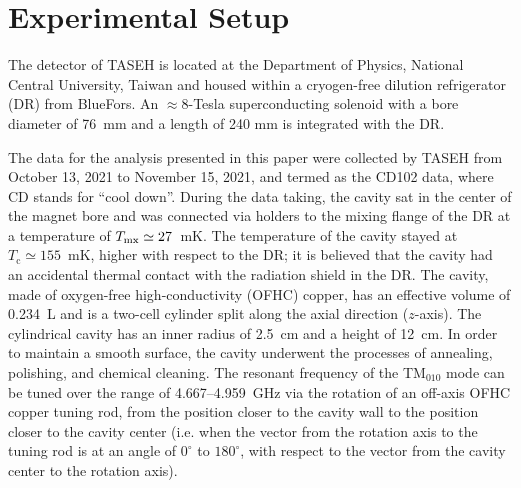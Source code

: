
\section{Experimental Setup}\label{sec:taseh} 
The detector of TASEH is located at the Department of Physics, National 
Central University, Taiwan and housed within a cryogen-free dilution 
refrigerator (DR) from BlueFors. An $\approx$8-Tesla superconducting solenoid 
with a 
bore diameter of 76~mm and a length of 240 mm is integrated with the DR. 

The data for the analysis presented in this paper were collected by TASEH 
from October 13, 2021 to November 15, 2021, and termed as the CD102 data, 
where CD stands for ``cool down''. 
During the data taking, the cavity sat in the center of the magnet bore 
and was connected via holders to the mixing flange of the DR at a 
temperature of $T_{\rm mx}\simeq27$~mK. 
The temperature of the cavity stayed at $T_\text{c}\simeq155$~mK, higher 
with respect to the 
DR; it is believed that the cavity had an accidental thermal contact with the 
radiation shield in the DR. 
The cavity, made of oxygen-free high-conductivity (OFHC) copper, has an 
effective volume of 0.234~L and is a two-cell cylinder split along 
the axial direction ($z$-axis). 
The cylindrical cavity has an inner radius of 2.5~cm and a 
height of 12~cm.  In order to maintain a smooth surface, the cavity underwent 
the processes of annealing, polishing, and chemical cleaning. The resonant 
frequency of the TM$_{010}$ mode can be tuned over the range of 
4.667--4.959~GHz via the rotation of an off-axis OFHC copper tuning rod, from 
the position closer to the cavity wall to the position closer to the cavity 
center (i.e. when the vector from the rotation axis to the tuning rod is 
at an angle of $0^\circ$ to $180^\circ$, with respect to the vector from the 
cavity center to the rotation axis). 

